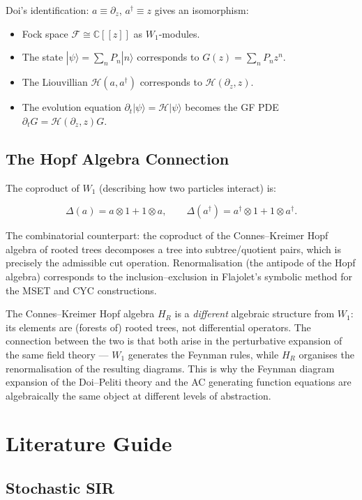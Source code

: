 \documentclass[11pt,a4paper]{article}
\theoremstyle{definition}
\newcommand{\C}{\mathbb{C}}
\newcommand{\ad}{a^\dagger}
\begin{document}
Doi's identification: $a \equiv \partial_z$, $\ad \equiv z$ gives an isomorphism:
\begin{itemize}[leftmargin=2em]
  \item Fock space $\mathcal{F} \cong \C[[z]]$ as $W_1$-modules.
  \item The state $|\psi\rangle = \sum_n P_n |n\rangle$ corresponds to $G(z) = \sum_n P_n z^n$.
  \item The Liouvillian $\mathcal{H}(a, \ad)$ corresponds to $\mathcal{H}(\partial_z, z)$.
  \item The evolution equation $\partial_t|\psi\rangle = \mathcal{H}|\psi\rangle$
        becomes the GF PDE $\partial_t G = \mathcal{H}(\partial_z, z)G$.
\end{itemize}

\subsection{The Hopf Algebra Connection}

The coproduct of $W_1$ (describing how two particles interact) is:

\[
  \Delta(a) = a \otimes 1 + 1 \otimes a, \qquad
  \Delta(\ad) = \ad \otimes 1 + 1 \otimes \ad.
\]

The combinatorial counterpart: the coproduct of the Connes--Kreimer Hopf algebra
of rooted trees decomposes a tree into subtree/quotient pairs, which is precisely
the admissible cut operation. Renormalisation (the antipode of the Hopf algebra)
corresponds to the inclusion--exclusion in Flajolet's symbolic method for the
MSET and CYC constructions.

The Connes--Kreimer Hopf algebra $H_R$ is a \emph{different} algebraic structure
from $W_1$: its elements are (forests of) rooted trees, not differential operators.
The connection between the two is that both arise in the perturbative expansion
of the same field theory --- $W_1$ generates the Feynman rules, while $H_R$
organises the renormalisation of the resulting diagrams. This is why the Feynman
diagram expansion of the Doi--Peliti theory and the AC generating function
equations are algebraically the same object at different levels of abstraction.

\section{Literature Guide}
\label{app:lit}

\subsection{Stochastic SIR}
\end{document}
